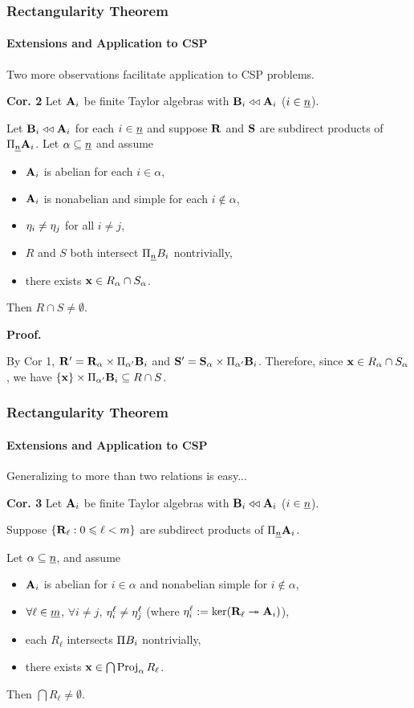 \documentclass[9pt,xcolor=dvipsnames%
   ]{beamer}
\newcommand{\csp}{\acs{CSP}\xspace}
\begin{document}
\begin{frame} \frametitle{Rectangularity Theorem}
  \framesubtitle{Extensions and Application to CSP}

  Two more observations facilitate application to \csp problems. 

  \bigskip
  {\bf Cor. 2} Let $\mathbf{A}_i$ be finite Taylor algebras with
  $\mathbf{B}_i \mathrel{\triangleleft\triangleleft} \mathbf{A}_i$ ($i\in \underline{n}$).
  
  Let $\mathbf{B}_i \mathrel{\triangleleft\triangleleft} \mathbf{A}_i$ for each $i\in \underline{n}$ and suppose
  $\mathbf{R}$ and $\mathbf{S}$ are subdirect products of $\Pi_{\underline{n}} \mathbf{A}_i$.
  Let $\alpha \subseteq \underline{n}$ and assume
  \begin{itemize}
  \item $\mathbf{A}_i$ is abelian for each $i \in \alpha$,
  \item $\mathbf{A}_i$ is nonabelian and simple for each $i \notin \alpha$,
  \item $\eta_i \neq \eta_j$ for all $i\neq j$,
  \item $R$ and $S$ both intersect $\Pi_{\underline{n}} B_i$ nontrivially, 
  \item there exists $\mathbf{x} \in R_\alpha \cap S_\alpha$.
  \end{itemize}
  Then $R \cap S \neq \emptyset$.

  {\bf Proof.}
  
    By Cor 1, $\mathbf{R}'= \mathbf{R}_\alpha   \times \Pi_{\alpha'}\mathbf{B}_i$ and
    $\mathbf{S}'= \mathbf{S}_\alpha   \times \Pi_{\alpha'}\mathbf{B}_i$. 
    Therefore, since $\mathbf{x} \in R_\alpha \cap S_\alpha$, we have
    $\{\mathbf{x}\} \times \Pi_{\alpha'}\mathbf{B}_i \subseteq R \cap S$.

\end{frame}

\begin{frame} \frametitle{Rectangularity Theorem}
  \framesubtitle{Extensions and Application to CSP}

  Generalizing to more than two relations is easy...

  \bigskip
  {\bf Cor. 3} Let $\mathbf{A}_i$ be finite Taylor algebras with
  $\mathbf{B}_i \mathrel{\triangleleft\triangleleft} \mathbf{A}_i$ ($i\in \underline{n}$).
  
  Suppose $\{\mathbf{R}_\ell : 0\leqslant \ell < m\}$ are subdirect products of 
  $\Pi_{\underline{n}} \mathbf{A}_i$.

  Let $\alpha \subseteq \underline{n}$, and assume
      \begin{itemize}
      \item $\mathbf{A}_i$ is abelian for $i \in \alpha$ and nonabelian simple for $i \notin \alpha$,
      \item $\forall \ell \in \underline{m}$, $\forall i\neq j$, 
        $\eta^\ell_i \neq \eta^\ell_j$  {\small (where $\eta^\ell_i := \ker(\mathbf{R}_\ell \twoheadrightarrow \mathbf{A}_i)$)},
      \item each $R_\ell$ intersects $\Pi B_i$ nontrivially, 
      \item there exists $\mathbf{x} \in \bigcap \operatorname{Proj}_\alpha R_\ell$.
      \end{itemize}
      Then $\bigcap R_\ell \neq \emptyset$.

\end{frame}
\end{document}

